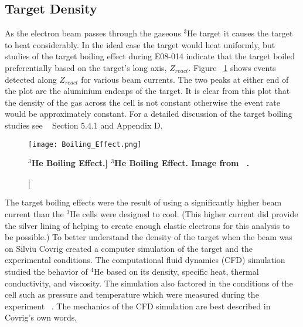 \subsection{Target Density}
\label{ssec:density}

As the electron beam passes through the gaseous $^3$He target it causes the target to heat considerably. In the ideal case the target would heat uniformly, but studies of the target boiling effect during E08-014 indicate that the target boiled preferentially based on the target's long axis, $Z_{react}$. Figure ~\ref{fig:boiling_effect} shows events detected along $Z_{react}$ for various beam currents. The two peaks at either end of the plot are the aluminium endcaps of the target. It is clear from this plot that the density of the gas across the cell is not constant otherwise the event rate would be approximately constant. For a detailed discussion of the target boiling studies see ~\cite{Thesis:Ye} Section 5.4.1 and Appendix D. 

\begin{figure}[!ht]
\begin{center}
\texttt{[image: Boiling\_Effect.png]}
\end{center}
\caption[\bf{$^3$He Boiling Effect.}]{
{\bf{$^3$He Boiling Effect.}} Image from ~\cite{Thesis:Ye}.}
\label{fig:boiling_effect}
\end{figure}

The target boiling effects were the result of using a significantly higher beam current than the $^3$He cells were designed to cool. (This higher current did provide the silver lining of helping to create enough elastic electrons for this analysis to be possible.) To better understand the density of the target when the beam was on Silviu Covrig created a computer simulation of the target and the experimental conditions. The computational fluid dynamics (CFD) simulation studied the behavior of $^4$He based on its density, specific heat, thermal conductivity, and viscosity. The simulation also factored in the conditions of the cell such as pressure and temperature which were measured during the experiment ~\cite{density}. The mechanics of the CFD simulation are best described in Covrig's own words, 

